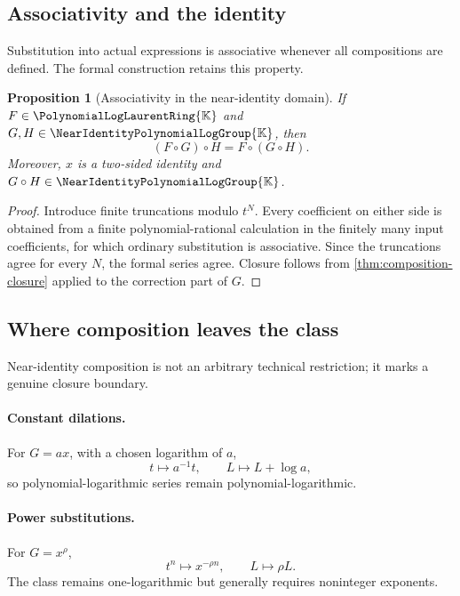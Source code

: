 \documentclass[11pt]{article}
\theoremstyle{pltheorem}
\newtheorem{proposition}[theorem]{Proposition}
\newcommand{\K}{\mathbb K}
\newcommand{\PLL}{\PolynomialLogLaurentRing{\K}}
\newcommand{\Gnear}{\NearIdentityPolynomialLogGroup{\K}}
\newcommand{\compose}{\mathbin{\circ}}
\begin{document}
\subsection{Associativity and the identity}

Substitution into actual expressions is associative whenever all compositions are defined.  The formal construction retains this property.

\begin{proposition}[Associativity in the near-identity domain]\label{prop:composition-associative}
If \(F\in\PLL\) and \(G,H\in\Gnear\), then
\begin{equation}\label{eq:composition-assoc}
 (F\compose G)\compose H=F\compose(G\compose H).
\end{equation}
Moreover, \(x\) is a two-sided identity and \(G\compose H\in\Gnear\).
\end{proposition}

\begin{proof}
Introduce finite truncations modulo \(t^N\).  Every coefficient on either side is obtained from a finite polynomial-rational calculation in the finitely many input coefficients, for which ordinary substitution is associative.  Since the truncations agree for every \(N\), the formal series agree.  Closure follows from \cref{thm:composition-closure} applied to the correction part of \(G\).
\end{proof}

\subsection{Where composition leaves the class}

Near-identity composition is not an arbitrary technical restriction; it marks a genuine closure boundary.

\paragraph{Constant dilations.}
For \(G=ax\), with a chosen logarithm of \(a\),
\[
 t\mapsto a^{-1}t,
 \qquad
 L\mapsto L+\log a,
\]
so polynomial-logarithmic series remain polynomial-logarithmic.

\paragraph{Power substitutions.}
For \(G=x^\rho\),
\[
 t^n\mapsto x^{-\rho n},
 \qquad
 L\mapsto\rho L.
\]
The class remains one-logarithmic but generally requires noninteger exponents.
\end{document}
